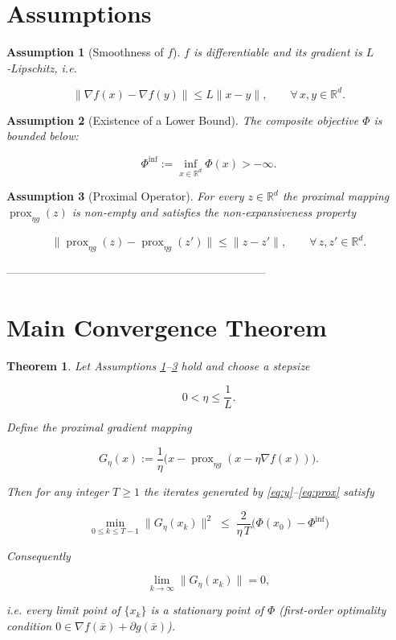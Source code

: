 \documentclass{article}
\newtheorem{theorem}{Theorem}
\newtheorem{assumption}{Assumption}
\newcommand{\prox}{\operatorname{prox}}
\newcommand{\grad}{\nabla}
\newcommand{\R}{\mathbb{R}}
\begin{document}
\section*{Assumptions}
\begin{assumption}[Smoothness of $f$]\label{ass:Lip}
$f$ is differentiable and its gradient is $L$‑Lipschitz, i.e.  

\[
\|\grad f(x)-\grad f(y)\|\le L\|x-y\|,\qquad\forall\,x,y\in\R^{d}.
\tag{A1}
\]
\end{assumption}
\begin{assumption}[Existence of a Lower Bound]\label{ass:bounded}
The composite objective $\Phi$ is bounded below:  

\[
\Phi^{\inf}:=\inf_{x\in\R^{d}}\Phi(x)>-\infty .
\tag{A2}
\]
\end{assumption}
\begin{assumption}[Proximal Operator]\label{ass:prox}
For every $z\in\R^{d}$ the proximal mapping $\prox_{\eta g}(z)$ is non‑empty and satisfies the \emph{non‑expansiveness} property  

\[
\|\prox_{\eta g}(z)-\prox_{\eta g}(z')\|\le\|z-z'\|,\qquad\forall\,z,z'\in\R^{d}.
\tag{A3}
\]
\end{assumption}

---------------------------------------------------------------------

\section*{Main Convergence Theorem}
\begin{theorem}\label{thm:main}
Let Assumptions \ref{ass:Lip}–\ref{ass:prox} hold and choose a stepsize  

\[
0<\eta\le\frac{1}{L}.
\]

Define the \emph{proximal gradient mapping}  

\[
G_{\eta}(x):=\frac{1}{\eta}\bigl(x-\prox_{\eta g}(x-\eta\grad f(x))\bigr).
\tag{2}
\]

Then for any integer $T\ge 1$ the iterates generated by \eqref{eq:y}–\eqref{eq:prox} satisfy  

\[
\boxed{\;
\min_{0\le k\le T-1}\|G_{\eta}(x_{k})\|^{2}
\;\le\;
\frac{2}{\eta\,T}\bigl(\Phi(x_{0})-\Phi^{\inf}\bigr)
\;}
\tag{3}
\]

Consequently  

\[
\lim_{k\to\infty}\|G_{\eta}(x_{k})\|=0,
\]

i.e. every limit point of $\{x_{k}\}$ is a \emph{stationary point} of $\Phi$ (first‑order optimality condition $0\in\grad f(\bar x)+\partial g(\bar x)$).
\end{theorem}
\end{document}
